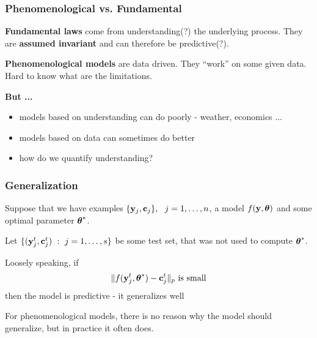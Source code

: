 \documentclass[12pt,fleqn]{beamer}
\begin{document}
\begin{frame}\frametitle{Phenomenological vs. Fundamental}

\textbf{Fundamental laws} come from understanding(?) the underlying process.
They are {\bf assumed invariant} and can therefore be predictive(?).

\bigskip

\textbf{Phenomenological models} are data driven. They ``work'' on some given data.
Hard to know what are the limitations.

\bigskip

{\bf But ...}
\begin{itemize}
\item models based on understanding can do poorly - weather, economics ...
\item models based on data can sometimes do better
\item how do we quantify understanding?
\end{itemize}

\end{frame}


\begin{frame}\frametitle{Generalization}

Suppose that we have examples $\{{\bf y}_j,{\bf c}_j\},\ \ j=1,\ldots,n$,
a model $f({\bf y},{\boldsymbol \theta})$ and some optimal parameter ${\boldsymbol \theta}^*$.

Let $\{({\bf y}^t_j,{\bf c}^t_j) \ : \  j=1,\ldots,s\}$ be some test set, that was not used
to compute ${\boldsymbol \theta}^*$.

\pause

Loosely speaking, if
$$ \|f({\bf y}^t_j,{\boldsymbol \theta}^*) - {\bf c}_j^t\|_p \text{ is small}$$
then the model is predictive - it generalizes well



\pause
\bigskip


For phenomenological models, there is no reason why the model
should generalize, but in practice it often does.


\end{frame}
\end{document}
